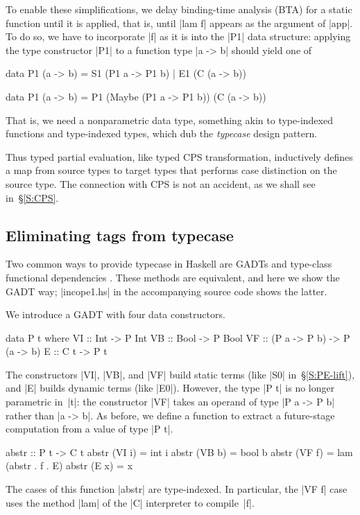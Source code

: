 \documentclass[preprint]{sigplanconf}
\begin{document}
To enable these simplifications, we delay binding-time analysis (BTA)
for a static function until it is applied, that is, until |lam f|
appears as the argument of |app|.  To do so, we have to incorporate |f|
as it is into the |P1| data structure: applying the type constructor
|P1| to a function type |a -> b| should yield one of
\begin{code}
data P1 (a -> b) = S1 (P1 a -> P1 b)
                 | E1 (C (a -> b))

data P1 (a -> b) = P1 (Maybe (P1 a -> P1 b))
                      (C (a -> b))
\end{code}
That is, we need a nonparametric data type, something akin to
type-indexed functions and type-indexed types, which
\citet{oliveira-typecase} dub the \emph{typecase} design pattern.

Thus typed partial evaluation, like typed CPS transformation,
inductively defines a map from source types to target types that
performs case distinction on the source type.  The connection with CPS
is not an accident, as we shall see in~\S\ref{S:CPS}.

\subsection{Eliminating tags from typecase}
\label{S:PE-GADT}

Two common ways to provide typecase in Haskell are
GADTs and type-class functional dependencies
\citep{oliveira-typecase}.  These
methods are equivalent, and here we show the GADT way; |incope1.hs|
in the accompanying source code shows the latter.

We introduce a GADT with four data constructors.
\begin{code}
data P t where
  VI :: Int  -> P Int
  VB :: Bool -> P Bool
  VF :: (P a -> P b) -> P (a -> b)
  E  :: C t -> P t
\end{code}
The constructors |VI|, |VB|, and |VF| build static terms (like |S0|
in~\S\ref{S:PE-lift}), and |E| builds dynamic terms (like |E0|).  However,
the type |P t| is no longer parametric in~|t|: the constructor |VF| takes an
operand of type |P a -> P b| rather than |a -> b|. As before, we define a
function to extract a future-stage computation from a value of type |P t|.
\begin{code}
abstr :: P t -> C t
abstr (VI i) = int i
abstr (VB b) = bool b
abstr (VF f) = lam (abstr . f . E)
abstr (E x)  = x
\end{code}
The cases of this function |abstr| are type-indexed.  In particular, the |VF f|
case uses the method |lam| of the |C| interpreter to compile~|f|.
\end{document}
